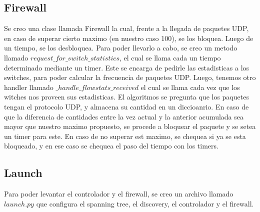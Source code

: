 \subsection{Firewall}
	Se creo una clase llamada Firewall la cual, frente a la llegada de paquetes UDP, en caso de superar cierto maximo (en nuestro caso 		100), se los bloquea. Luego de un tiempo, se los desbloquea. Para poder llevarlo a cabo, se creo un metodo 
	llamado	$request\_for\_switch\_statistics$, el cual se llama cada un tiempo determinado mediante un timer. Este se encarga de pedirle 		las estadisticas a los switches, para poder calcular la frecuencia de paquetes UDP. Luego, tenemos otro handler 
	llamado $\_handle\_flowstats\_received$ el cual se llama cada vez que los witches nos proveen sus estadisticas. El algoritmos se 		pregunta que los paquetes tengan el protocolo UDP, y almacena su cantidad en un diccioanrio. En caso de que la diferencia de cantidades 	entre la vez actual y la anterior acumulada sea mayor que nuestro maximo propuesto, se procede a bloquear el paquete y se setea un 		timer para este. En caso de no superar est maximo, se chequea si ya se esta bloqueado, y en ese caso se chequea el paso del tiempo con 		los timers.

\subsection{Launch}
	Para poder levantar el controlador y el firewall, se creo un archivo llamado $launch.py$ que configura el spanning tree, el discovery, 		el controlador y el firewall.






